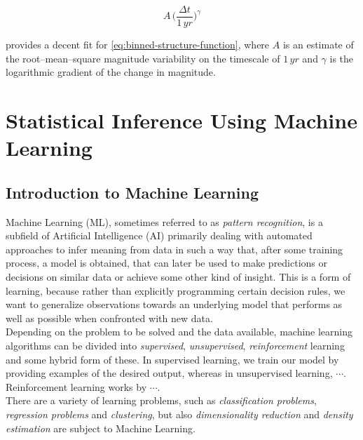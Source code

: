 \begin{equation}
A \, \big(\frac{\Delta t}{1 \, \unit{yr}}\big)^\gamma
\end{equation}

provides a decent fit for \eqref{eq:binned-structure-function}, where $A$ is an estimate of the root--mean--square magnitude variability on the timescale of $1 \, \unit{yr}$ and $\gamma$ is the logarithmic gradient of the change in magnitude.

\section{Statistical Inference Using Machine Learning}

\subsection{Introduction to Machine Learning}
\label{sec:introduction-machine-learning}

Machine Learning (ML), sometimes referred to as \emph{pattern recognition}, is a subfield of Artificial Intelligence (AI) primarily dealing with automated approaches to infer meaning from data in such a way that, after some training process, a model is obtained, that can later be used to make predictions or decisions on similar data or achieve some other kind of insight. This is a form of learning, because rather than explicitly programming certain decision rules, we want to generalize observations towards an underlying model that performs as well as possible when confronted with new data.\\

Depending on the problem to be solved and the data available, machine learning algorithms can be divided into \emph{supervised}, \emph{unsupervised}, \emph{reinforcement} learning and some hybrid form of these. In supervised learning, we train our model by providing examples of the desired output, whereas in unsupervised learning, $\cdots$. Reinforcement learning works by $\cdots$.\\

There are a variety of learning problems, such as \emph{classification problems}, \emph{regression problems} and \emph{clustering}, but also \emph{dimensionality reduction} and \emph{density estimation} are subject to Machine Learning.\\


